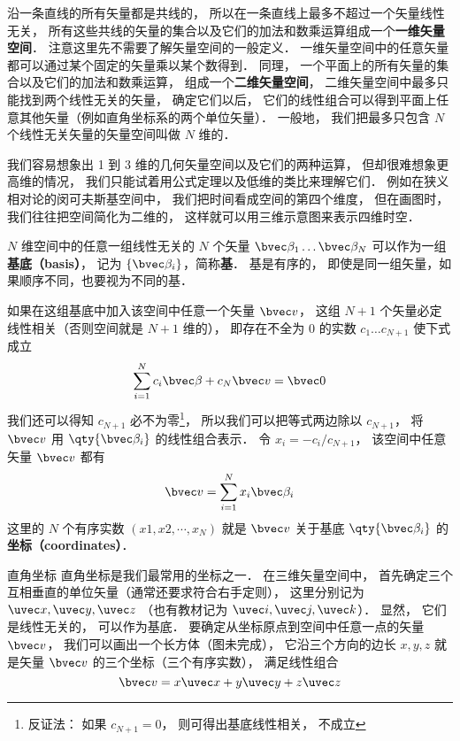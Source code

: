 








沿一条直线的所有矢量都是共线的， 所以在一条直线上最多不超过一个矢量线性无关， 所有这些共线的矢量的集合以及它们的加法和数乘运算组成一个\textbf{一维矢量空间}． 注意这里先不需要了解矢量空间的一般定义． 一维矢量空间中的任意矢量都可以通过某个固定的矢量乘以某个数得到． 同理， 一个平面上的所有矢量的集合以及它们的加法和数乘运算， 组成一个\textbf{二维矢量空间}， 二维矢量空间中最多只能找到两个线性无关的矢量， 确定它们以后， 它们的线性组合可以得到平面上任意其他矢量（例如直角坐标系的两个单位矢量）． 一般地， 我们把最多只包含 $N$ 个线性无关矢量的矢量空间叫做 $N$ 维的．

我们容易想象出 1 到 3 维的几何矢量空间以及它们的两种运算， 但却很难想象更高维的情况， 我们只能试着用公式定理以及低维的类比来理解它们． 例如在狭义相对论的闵可夫斯基空间中， 我们把时间看成空间的第四个维度， 但在画图时， 我们往往把空间简化为二维的， 这样就可以用三维示意图来表示四维时空．

$N$ 维空间中的任意一组线性无关的 $N$ 个矢量 $\bvec \beta_1\dots \bvec \beta_N$ 可以作为一组\textbf{基底（basis）}， 记为 $\{\bvec \beta_i\}$，简称\textbf{基}． 基是有序的， 即使是同一组矢量，如果顺序不同，也要视为不同的基．

如果在这组基底中加入该空间中任意一个矢量 $\bvec v$， 这组 $N+1$ 个矢量必定线性相关（否则空间就是 $N+1$ 维的）， 即存在不全为 0 的实数 $c_1\dots c_{N+1}$ 使下式成立
\begin{equation}
\sum_{i=1}^{N} c_i \bvec \beta + c_N \bvec v = \bvec 0
\end{equation}
我们还可以得知 $c_{N+1}$ 必不为零\footnote{反证法： 如果 $c_{N+1} = 0$， 则可得出基底线性相关， 不成立}， 所以我们可以把等式两边除以 $c_{N+1}$， 将 $\bvec v$ 用 $\qty{\bvec \beta_i}$ 的线性组合表示． 令 $x_i = -c_i/c_{N+1}$， 该空间中任意矢量 $\bvec v$ 都有
\begin{equation}\label{GVec_eq5}
\bvec v = \sum_{i=1}^N x_i \bvec \beta_i
\end{equation}
这里的 $N$ 个有序实数 $(x1, x2, \cdots, x_N)$ 就是 $\bvec v$ 关于基底 $\qty{\bvec \beta_i}$ 的\textbf{坐标（coordinates）}．

\begin{example}{直角坐标}
直角坐标是我们最常用的坐标之一． 在三维矢量空间中， 首先确定三个互相垂直的单位矢量（通常还要求符合右手定则）， 这里分别记为 $\uvec x, \uvec y, \uvec z$ （也有教材记为 $\uvec i, \uvec j, \uvec k$）． 显然， 它们是线性无关的， 可以作为基底． 要确定从坐标原点到空间中任意一点的矢量 $\bvec v$， 我们可以画出一个长方体（图未完成）， 它沿三个方向的边长 $x, y, z$ 就是矢量 $\bvec v$ 的三个坐标（三个有序实数）， 满足线性组合
\begin{equation}\label{GVec_eq4}
\bvec v = x\uvec x + y\uvec y + z\uvec z
\end{equation}
\end{example}

